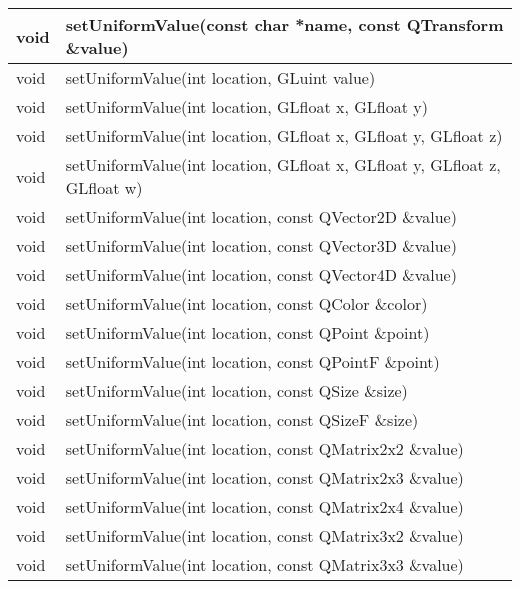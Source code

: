 \begin{longtable}[l]{|l|m{34em}|}
    \hline
    void	&setUniformValue(const char *name, const QTransform \&value) \\ 
    \hline
    void	&setUniformValue(int location, GLuint value) \\ 
    \hline
    void	&setUniformValue(int location, GLfloat x, GLfloat y) \\ 
    \hline
    void	&setUniformValue(int location, GLfloat x, GLfloat y, GLfloat z) \\
    \hline
    void	&setUniformValue(int location, GLfloat x, GLfloat y, GLfloat z, GLfloat w) \\ 
    \hline
    void	&setUniformValue(int location, const QVector2D \&value) \\ 
    \hline
    void	&setUniformValue(int location, const QVector3D \&value) \\
    \hline
    void	&setUniformValue(int location, const QVector4D \&value) \\ 
    \hline
    void	&setUniformValue(int location, const QColor \&color) \\
    \hline
    void	&setUniformValue(int location, const QPoint \&point) \\ 
    \hline
    void	&setUniformValue(int location, const QPointF \&point) \\ 
    \hline
    void	&setUniformValue(int location, const QSize \&size) \\ 
    \hline
    void &	setUniformValue(int location, const QSizeF \&size) \\ 
    \hline
    void	&setUniformValue(int location, const QMatrix2x2 \&value)\\ 
    \hline
    void	&setUniformValue(int location, const QMatrix2x3 \&value) \\
    \hline
    void	&setUniformValue(int location, const QMatrix2x4 \&value) \\ 
    \hline
    void	&setUniformValue(int location, const QMatrix3x2 \&value) \\ 
    \hline
    void	&setUniformValue(int location, const QMatrix3x3 \&value) \\ 


\end{longtable}

